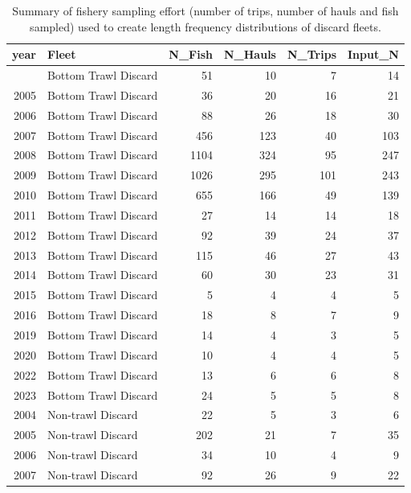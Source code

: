 \documentclass[
]{scrartcl}
\begin{document}
\endgroup

\newpage{}

\begingroup
\fontsize{9.0pt}{10.8pt}\selectfont

\begin{longtable}{rlrrrr}

\caption{\label{tbl-discard_sample_sizes}Summary of fishery sampling
effort (number of trips, number of hauls and fish sampled) used to
create length frequency distributions of discard fleets.}

\tabularnewline

\toprule
year & Fleet & N\_Fish & N\_Hauls & N\_Trips & Input\_N \\ 
\midrule\addlinespace[2.5pt]
2004 & Bottom Trawl Discard & 51 & 10 & 7 & 14 \\ 
2005 & Bottom Trawl Discard & 36 & 20 & 16 & 21 \\ 
2006 & Bottom Trawl Discard & 88 & 26 & 18 & 30 \\ 
2007 & Bottom Trawl Discard & 456 & 123 & 40 & 103 \\ 
2008 & Bottom Trawl Discard & 1104 & 324 & 95 & 247 \\ 
2009 & Bottom Trawl Discard & 1026 & 295 & 101 & 243 \\ 
2010 & Bottom Trawl Discard & 655 & 166 & 49 & 139 \\ 
2011 & Bottom Trawl Discard & 27 & 14 & 14 & 18 \\ 
2012 & Bottom Trawl Discard & 92 & 39 & 24 & 37 \\ 
2013 & Bottom Trawl Discard & 115 & 46 & 27 & 43 \\ 
2014 & Bottom Trawl Discard & 60 & 30 & 23 & 31 \\ 
2015 & Bottom Trawl Discard & 5 & 4 & 4 & 5 \\ 
2016 & Bottom Trawl Discard & 18 & 8 & 7 & 9 \\ 
2019 & Bottom Trawl Discard & 14 & 4 & 3 & 5 \\ 
2020 & Bottom Trawl Discard & 10 & 4 & 4 & 5 \\ 
2022 & Bottom Trawl Discard & 13 & 6 & 6 & 8 \\ 
2023 & Bottom Trawl Discard & 24 & 5 & 5 & 8 \\ 
2004 & Non-trawl Discard & 22 & 5 & 3 & 6 \\ 
2005 & Non-trawl Discard & 202 & 21 & 7 & 35 \\ 
2006 & Non-trawl Discard & 34 & 10 & 4 & 9 \\ 
2007 & Non-trawl Discard & 92 & 26 & 9 & 22 \\ 

\end{longtable}
\end{document}
